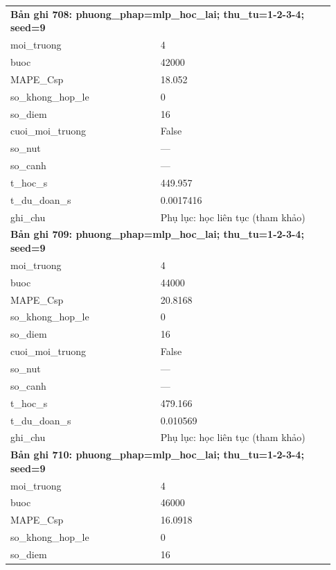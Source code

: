 \begin{longtable}{p{0.43\linewidth}p{0.50\linewidth}}
\midrule
\multicolumn{2}{p{0.95\linewidth}}{\textbf{Bản ghi 708: phuong\_phap=mlp\_hoc\_lai; thu\_tu=1-2-3-4; seed=9}} \\
moi\_\allowbreak truong & 4 \\
buoc & 42000 \\
MAPE\_\allowbreak Csp & 18.052 \\
so\_\allowbreak khong\_\allowbreak hop\_\allowbreak le & 0 \\
so\_\allowbreak diem & 16 \\
cuoi\_\allowbreak moi\_\allowbreak truong & False \\
so\_\allowbreak nut & — \\
so\_\allowbreak canh & — \\
t\_\allowbreak hoc\_\allowbreak s & 449.957 \\
t\_\allowbreak du\_\allowbreak doan\_\allowbreak s & 0.0017416 \\
ghi\_\allowbreak chu & Phụ lục: học liên tục (tham khảo) \\
\midrule
\multicolumn{2}{p{0.95\linewidth}}{\textbf{Bản ghi 709: phuong\_phap=mlp\_hoc\_lai; thu\_tu=1-2-3-4; seed=9}} \\
moi\_\allowbreak truong & 4 \\
buoc & 44000 \\
MAPE\_\allowbreak Csp & 20.8168 \\
so\_\allowbreak khong\_\allowbreak hop\_\allowbreak le & 0 \\
so\_\allowbreak diem & 16 \\
cuoi\_\allowbreak moi\_\allowbreak truong & False \\
so\_\allowbreak nut & — \\
so\_\allowbreak canh & — \\
t\_\allowbreak hoc\_\allowbreak s & 479.166 \\
t\_\allowbreak du\_\allowbreak doan\_\allowbreak s & 0.010569 \\
ghi\_\allowbreak chu & Phụ lục: học liên tục (tham khảo) \\
\midrule
\multicolumn{2}{p{0.95\linewidth}}{\textbf{Bản ghi 710: phuong\_phap=mlp\_hoc\_lai; thu\_tu=1-2-3-4; seed=9}} \\
moi\_\allowbreak truong & 4 \\
buoc & 46000 \\
MAPE\_\allowbreak Csp & 16.0918 \\
so\_\allowbreak khong\_\allowbreak hop\_\allowbreak le & 0 \\
so\_\allowbreak diem & 16 \\

\end{longtable}
